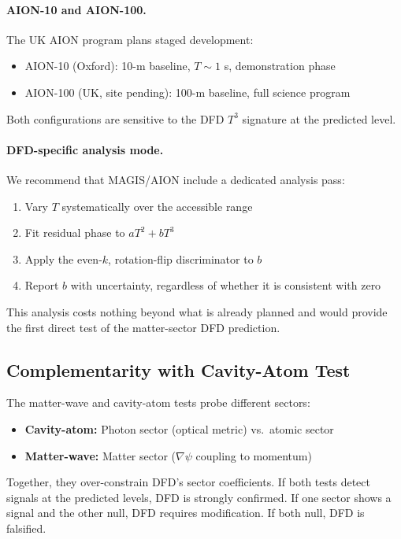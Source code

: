 \paragraph{AION-10 and AION-100.}
The UK AION program plans staged development:
\begin{itemize}
\item AION-10 (Oxford): 10-m baseline, $T \sim 1$ s, demonstration phase
\item AION-100 (UK, site pending): 100-m baseline, full science program
\end{itemize}
Both configurations are sensitive to the DFD $T^3$ signature at the predicted level.

\paragraph{DFD-specific analysis mode.}
We recommend that MAGIS/AION include a dedicated analysis pass:
\begin{enumerate}
\item Vary $T$ systematically over the accessible range
\item Fit residual phase to $aT^2 + bT^3$
\item Apply the even-$k$, rotation-flip discriminator to $b$
\item Report $b$ with uncertainty, regardless of whether it is consistent with zero
\end{enumerate}
This analysis costs nothing beyond what is already planned and would provide 
the first direct test of the matter-sector DFD prediction.

\subsection{Complementarity with Cavity-Atom Test}\label{sec:mw-complementarity}

The matter-wave and cavity-atom tests probe different sectors:

\begin{itemize}
\item \textbf{Cavity-atom:} Photon sector (optical metric) vs.\ atomic sector
\item \textbf{Matter-wave:} Matter sector ($\nabla\psi$ coupling to momentum)
\end{itemize}

Together, they over-constrain DFD's sector coefficients. If both tests detect signals at the predicted levels, DFD is strongly confirmed. If one sector shows a signal and the other null, DFD requires modification. If both null, DFD is falsified.

